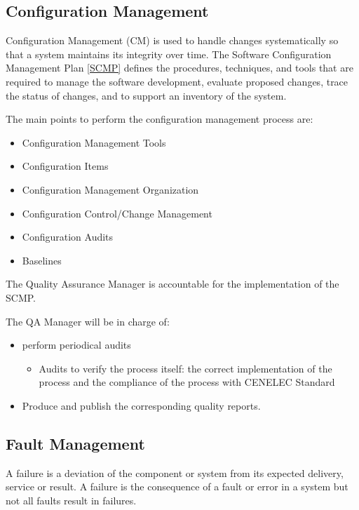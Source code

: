 \documentclass{template/openetcs_article}
\begin{document}
\subsection{Configuration Management}

Configuration Management (CM) is used to handle changes systematically so that a system maintains its integrity over time. The Software Configuration Management Plan  \href{https://github.com/openETCS/governance/blob/master/SCMP/SCMP_0.0.0.pdf}{[SCMP]} \cite{scmp} defines the procedures, techniques, and tools that are required to manage the software development, evaluate proposed changes, trace the status of changes, and to support an inventory of the system. 

The main points to perform the configuration management process are:

\vspace{-10pt}
\begin{itemize}
\item Configuration Management Tools
\item Configuration Items
\item Configuration Management Organization
\item Configuration Control/Change Management
\item Configuration Audits
\item Baselines
\end{itemize}

The Quality Assurance Manager is accountable for the implementation of the \gls{SCMP}.

The QA Manager will be in charge of:
\begin{itemize}
\item perform periodical audits
\begin{itemize}
\item Audits to verify the process itself: the correct implementation of the process and the compliance of the process with CENELEC Standard
\end{itemize}
\item Produce and publish the corresponding quality reports.
\end{itemize}

\subsection{Fault Management}

A failure is a deviation of the component or system from its expected delivery, service or result. A failure is the consequence of a fault or error in a system but not all faults result in failures.
\end{document}
